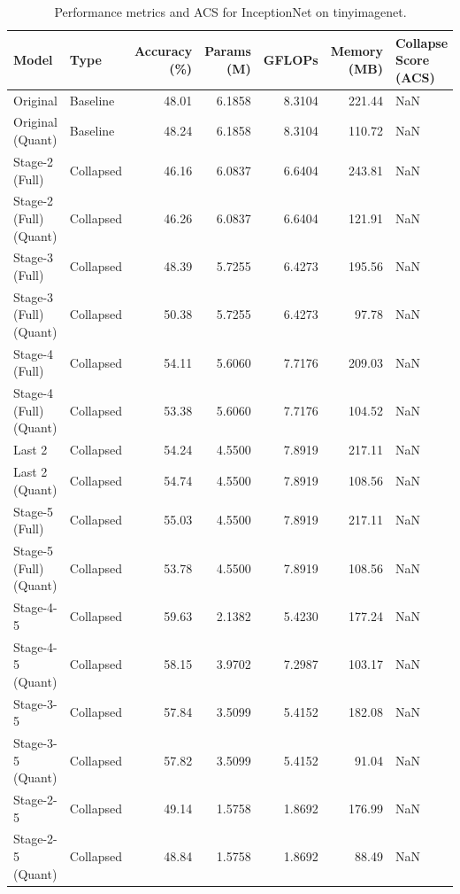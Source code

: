 \begin{table}
\caption{Performance metrics and ACS for InceptionNet on tinyimagenet.}
\label{tab:InceptionNet_tinyimagenet}
\begin{tabular}{llrrrrl}
\toprule
Model & Type & Accuracy (\%) & Params (M) & GFLOPs & Memory (MB) & Collapse Score (ACS) \\
\midrule
Original & Baseline & 48.01 & 6.1858 & 8.3104 & 221.44 & NaN \\
Original
(Quant) & Baseline & 48.24 & 6.1858 & 8.3104 & 110.72 & NaN \\
Stage-2 (Full) & Collapsed & 46.16 & 6.0837 & 6.6404 & 243.81 & NaN \\
Stage-2 (Full)
(Quant) & Collapsed & 46.26 & 6.0837 & 6.6404 & 121.91 & NaN \\
Stage-3 (Full) & Collapsed & 48.39 & 5.7255 & 6.4273 & 195.56 & NaN \\
Stage-3 (Full)
(Quant) & Collapsed & 50.38 & 5.7255 & 6.4273 & 97.78 & NaN \\
Stage-4 (Full) & Collapsed & 54.11 & 5.6060 & 7.7176 & 209.03 & NaN \\
Stage-4 (Full)
(Quant) & Collapsed & 53.38 & 5.6060 & 7.7176 & 104.52 & NaN \\
Last 2 & Collapsed & 54.24 & 4.5500 & 7.8919 & 217.11 & NaN \\
Last 2
(Quant) & Collapsed & 54.74 & 4.5500 & 7.8919 & 108.56 & NaN \\
Stage-5 (Full) & Collapsed & 55.03 & 4.5500 & 7.8919 & 217.11 & NaN \\
Stage-5 (Full)
(Quant) & Collapsed & 53.78 & 4.5500 & 7.8919 & 108.56 & NaN \\
Stage-4-5 & Collapsed & 59.63 & 2.1382 & 5.4230 & 177.24 & NaN \\
Stage-4-5
(Quant) & Collapsed & 58.15 & 3.9702 & 7.2987 & 103.17 & NaN \\
Stage-3-5 & Collapsed & 57.84 & 3.5099 & 5.4152 & 182.08 & NaN \\
Stage-3-5
(Quant) & Collapsed & 57.82 & 3.5099 & 5.4152 & 91.04 & NaN \\
Stage-2-5 & Collapsed & 49.14 & 1.5758 & 1.8692 & 176.99 & NaN \\
Stage-2-5
(Quant) & Collapsed & 48.84 & 1.5758 & 1.8692 & 88.49 & NaN \\
\bottomrule
\end{tabular}
\end{table}
